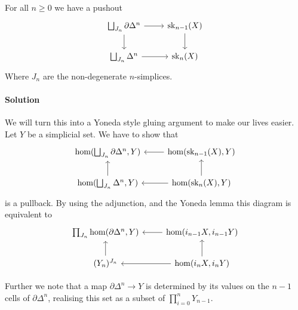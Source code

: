 \begin{exercise}
    For all $n \geq 0$ we have a pushout
    \[\begin{tikzcd}
        \bigsqcup_{J_n} \partial \Delta^n \ar[r] \ar[d] & \mathrm{sk}_{n-1}(X) \ar[d] \\
        \bigsqcup_{J_n} \Delta^n \ar[r] & \mathrm{sk}_{n}(X)
    \end{tikzcd}\]    
    Where $J_n$ are the non-degenerate $n$-simplices.

    \paragraph{Solution}
    We will turn this into a Yoneda style gluing argument to make our lives easier.
    Let $Y$ be a simplicial set. We have to show that 
    \[\begin{tikzcd}
        \hom(\bigsqcup_{J_n} \partial \Delta^n, Y) & \hom(\mathrm{sk}_{n-1}(X), Y) \ar[l]  \\
        \hom(\bigsqcup_{J_n} \Delta^n, Y) \ar[u] & \hom(\mathrm{sk}_{n}(X), Y) \ar[u] \ar[l]
    \end{tikzcd}\]
    is a pullback.
    By using the adjunction, and the Yoneda lemma this diagram is equivalent to
    \[\begin{tikzcd}
        \prod_{J_n} \hom(\partial \Delta^n, Y) & \hom(i_{n-1} X, i_{n-1} Y) \ar[l] \\
        (Y_n)^{J_n} \ar[u] & \hom(i_n X, i_n Y) \ar[u] \ar[l]
    \end{tikzcd}\]

    Further we note that a map $\partial \Delta^n \to Y$ is determined by its values on the $n-1$ cells of $\partial \Delta^n$,
    realising this set as a subset of $\prod_{i = 0}^n Y_{n-1}$.
    

\end{exercise}
